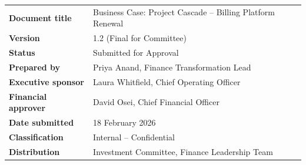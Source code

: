 \begin{titlepage}
\begin{center}
\renewcommand{\arraystretch}{1.35}
\begin{tabularx}{0.92\linewidth}{@{}>{\color{navy}\bfseries}l@{\hspace{10mm}}Y@{}}
\toprule
Document title & Business Case: Project Cascade -- Billing Platform Renewal \\
Version & 1.2 (Final for Committee) \\
Status & Submitted for Approval \\
Prepared by & Priya Anand, Finance Transformation Lead \\
Executive sponsor & Laura Whitfield, Chief Operating Officer \\
Financial approver & David Osei, Chief Financial Officer \\
Date submitted & 18 February 2026 \\
Classification & Internal -- Confidential \\
Distribution & Investment Committee, Finance Leadership Team \\
\bottomrule
\end{tabularx}
\end{center}

\vspace{1cm}
\end{titlepage}
